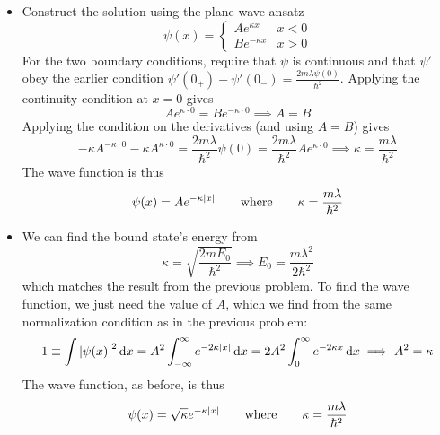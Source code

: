 \documentclass[11pt, a4paper]{article}
\newcommand{\diff}{\mathop{}\!\mathrm{d}} %
\newcommand{\eqtext}[1]{\qquad \text{#1} \qquad}
\begin{document}
\begin{itemize}
	
	\item Construct the solution using the plane-wave ansatz
	\begin{equation*}
		\psi(x) =
		\begin{cases}
			A e^{\kappa x} & x < 0\\
			B e^{-\kappa x} & x > 0
		\end{cases}
	\end{equation*}
	For the two boundary conditions, require that $ \psi $ is continuous and that $ \psi' $ obey the earlier condition $ \psi'(0_{+}) - \psi'(0_{-}) = \frac{2m\lambda\psi(0)}{\hbar^{2}} $. Applying the continuity condition at $ x = 0 $ gives
	\begin{equation*}
		A e^{\kappa \cdot 0} = B e^{-\kappa \cdot 0} \implies A = B
	\end{equation*}
	Applying the condition on the derivatives (and using $ A = B $) gives
	\begin{equation*}
		-\kappa A^{-\kappa \cdot 0} -\kappa A^{\kappa \cdot 0} = \frac{2m\lambda}{\hbar^{2}} \psi(0) = \frac{2m\lambda }{\hbar^{2}} Ae^{\kappa \cdot  0} \implies \kappa = \frac{m\lambda}{\hbar^{2}}
	\end{equation*}
	The wave function is thus
	\begin{equation*}
		\psi(x) = A e^{-\kappa \abs{x}} \eqtext{where} \kappa = \frac{m\lambda}{\hbar^{2}}
	\end{equation*}
	
	\item We can find the bound state's energy from
	\begin{equation*}
		\kappa = \sqrt{\frac{2mE_{0}}{\hbar^{2}}} \implies E_{0} = \frac{m\lambda^{2}}{2\hbar^{2}}
	\end{equation*}
	which matches the result from the previous problem. To find the wave function, we just need the value of $ A $, which we find from the same normalization condition as in the previous problem:
	\begin{equation*}
		1 \equiv \int \abs{\psi(x)}^{2} \diff x = A^{2} \int_{-\infty}^{\infty} e^{-2\kappa \abs{x}} \diff x = 2A^{2} \int_{0}^{\infty} e^{-2\kappa x} \diff x \implies A^{2} = \kappa
	\end{equation*}
	The wave function, as before, is thus
	\begin{equation*}
		\psi(x) = \sqrt{\kappa} e^{-\kappa \abs{x}} \eqtext{where} \kappa = \frac{m\lambda}{\hbar^{2}}
	\end{equation*}
	 
\end{itemize}
\end{document}
